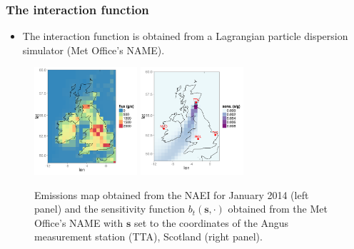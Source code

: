 \documentclass{beamer}
\newcommand{\s}{\mathbf{s}}
\begin{document}
\begin{frame}
\frametitle{The interaction function}

\begin{itemize}
\item The interaction function is obtained from a Lagrangian particle dispersion simulator (Met Office's NAME).
\end{itemize}

\begin{center}
\begin{figure}
\includegraphics[width=1.5in]{NAEI.png}  
\includegraphics[width=1.5in]{TAC_01_01.png}
\caption{Emissions map obtained from the NAEI for January 2014 (left panel) and the sensitivity function $b_t(\s,\cdot)$ obtained from the Met Office's NAME  with $\s$ set to the coordinates of the Angus measurement station (\textsc{TTA}), Scotland (right panel).}
\end{figure}
\end{center}
\end{frame}


\end{document}
